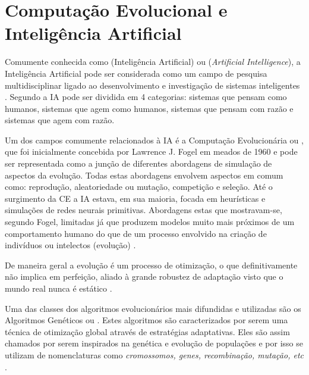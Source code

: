 \section{Computação Evolucional e Inteligência Artificial}
Comumente conhecida como  (Inteligência Artificial) ou  (\emph{Artificial Intelligence}), a Inteligência Artificial pode ser considerada como um campo de pesquisa multidisciplinar ligado ao desenvolvimento e investigação de sistemas inteligentes \cite{Book-Brownlee2011}. Segundo \cite{Book-Russel2009} a IA pode ser dividida em 4 categorias: sistemas que pensam como humanos, sistemas que agem como humanos, sistemas que pensam com razão e sistemas que agem com razão.

Um dos campos comumente relacionados à IA é a Computação Evolucionária ou , que foi inicialmente concebida por Lawrence J. Fogel em meados de 1960 e pode ser representada como a junção de diferentes abordagens de simulação de aspectos da evolução. Todas estas abordagens envolvem aspectos em comum como: reprodução, aleatoriedade ou mutação, competição e seleção. Até o surgimento da CE a IA estava, em sua maioria, focada em heurísticas e simulações de redes neurais primitivas. Abordagens estas que mostravam-se, segundo Fogel, limitadas já que produzem modelos muito mais próximos de um comportamento humano do que de um processo envolvido na criação de indivíduos ou intelectos (evolução) \cite{Book-Back2000}.

De maneira geral a evolução é um processo de otimização, o que definitivamente não implica em perfeição, aliado à grande robustez de adaptação visto que o mundo real nunca é estático \cite{Book-Back2000}.

Uma das classes dos algoritmos evolucionários mais difundidas e utilizadas são os Algoritmos Genéticos ou . Estes algoritmos são caracterizados por serem uma técnica de otimização global através de estratégias adaptativas. Eles são assim chamados por serem inspirados na genética e evolução de populações e por isso se utilizam de nomenclaturas como \emph{cromossomos, genes, recombinação, mutação, etc} \cite{Book-Brownlee2011}.

